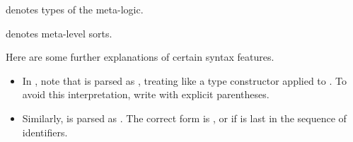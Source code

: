\begin{isabellebody}
\begin{isamarkuptext}
\begin{description}
  \item {}\hyperlink{syntax.inner.type}{\mbox{}} denotes types of the meta-logic.

  \item {}\hyperlink{syntax.inner.sort}{\mbox{}} denotes meta-level sorts.

  \end{description}

  Here are some further explanations of certain syntax features.

  \begin{itemize}

  \item In \hyperlink{syntax.inner.idts}{\mbox{}}, note that  is
  parsed as , treating  like a type
  constructor applied to .  To avoid this interpretation,
  write  with explicit parentheses.

  \item Similarly,  is parsed as .  The correct form is , or  if  is last in the
  sequence of identifiers.


\end{itemize}
\end{isamarkuptext}
\end{isabellebody}
